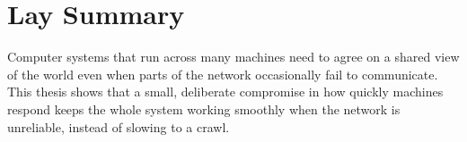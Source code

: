 \chapter{Lay Summary}

Computer systems that run across many machines need to agree on a
shared view of the world even when parts of the network occasionally
fail to communicate. This thesis shows that a small, deliberate
compromise in how quickly machines respond keeps the whole system
working smoothly when the network is unreliable, instead of slowing
to a crawl.
